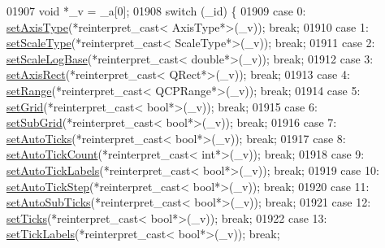 \begin{DoxyCode}
01907         \textcolor{keywordtype}{void} *\_v = \_a[0];
01908         \textcolor{keywordflow}{switch} (\_id) \{
01909         \textcolor{keywordflow}{case} 0: \hyperlink{a00025_a3976dba7137c71a2a1a34737ff9baff9}{setAxisType}(*reinterpret\_cast< AxisType*>(\_v)); \textcolor{keywordflow}{break};
01910         \textcolor{keywordflow}{case} 1: \hyperlink{a00025_adb6c5c45bdf899ea221881dd3b43b406}{setScaleType}(*reinterpret\_cast< ScaleType*>(\_v)); \textcolor{keywordflow}{break};
01911         \textcolor{keywordflow}{case} 2: \hyperlink{a00025_a726186054be90487885a748aa1b42188}{setScaleLogBase}(*reinterpret\_cast< double*>(\_v)); \textcolor{keywordflow}{break};
01912         \textcolor{keywordflow}{case} 3: \hyperlink{a00025_a0188c6248366fc9f9ff816dceee986e0}{setAxisRect}(*reinterpret\_cast< QRect*>(\_v)); \textcolor{keywordflow}{break};
01913         \textcolor{keywordflow}{case} 4: \hyperlink{a00025_a57d6ee9e9009fe88cb19db476ec70bca}{setRange}(*reinterpret\_cast< QCPRange*>(\_v)); \textcolor{keywordflow}{break};
01914         \textcolor{keywordflow}{case} 5: \hyperlink{a00025_a8d6d2bec40205fd3ca07cb1394663521}{setGrid}(*reinterpret\_cast< bool*>(\_v)); \textcolor{keywordflow}{break};
01915         \textcolor{keywordflow}{case} 6: \hyperlink{a00025_a7e5a64eaf71c64cadb790c5ce58d4729}{setSubGrid}(*reinterpret\_cast< bool*>(\_v)); \textcolor{keywordflow}{break};
01916         \textcolor{keywordflow}{case} 7: \hyperlink{a00025_ae867c23d3a6a7bd4d09cc66c5d018f63}{setAutoTicks}(*reinterpret\_cast< bool*>(\_v)); \textcolor{keywordflow}{break};
01917         \textcolor{keywordflow}{case} 8: \hyperlink{a00025_a7c7111cbeac9ec5fcb40f93a1ef51a0b}{setAutoTickCount}(*reinterpret\_cast< int*>(\_v)); \textcolor{keywordflow}{break};
01918         \textcolor{keywordflow}{case} 9: \hyperlink{a00025_aaa47e3a6bac0c20d4beb9028f01bc1a1}{setAutoTickLabels}(*reinterpret\_cast< bool*>(\_v)); \textcolor{keywordflow}{break};
01919         \textcolor{keywordflow}{case} 10: \hyperlink{a00025_a99fe77b034e06f5b723995beab96e741}{setAutoTickStep}(*reinterpret\_cast< bool*>(\_v)); \textcolor{keywordflow}{break};
01920         \textcolor{keywordflow}{case} 11: \hyperlink{a00025_adcbdec7a60054b88571e89599f4a45bf}{setAutoSubTicks}(*reinterpret\_cast< bool*>(\_v)); \textcolor{keywordflow}{break};
01921         \textcolor{keywordflow}{case} 12: \hyperlink{a00025_ac891409315bc379e3b1abdb162c1a011}{setTicks}(*reinterpret\_cast< bool*>(\_v)); \textcolor{keywordflow}{break};
01922         \textcolor{keywordflow}{case} 13: \hyperlink{a00025_a04ba16e1f6f78d70f938519576ed32c8}{setTickLabels}(*reinterpret\_cast< bool*>(\_v)); \textcolor{keywordflow}{break};

\end{DoxyCode}
